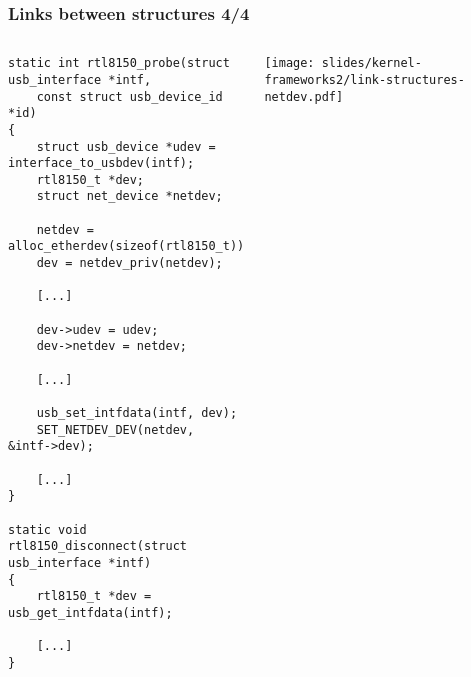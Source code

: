 \begin{frame}[fragile]
  \frametitle{Links between structures 4/4}
  \begin{columns}
    \begin{verbatim}
static int rtl8150_probe(struct usb_interface *intf,
    const struct usb_device_id *id)
{
    struct usb_device *udev = interface_to_usbdev(intf);
    rtl8150_t *dev;
    struct net_device *netdev;

    netdev = alloc_etherdev(sizeof(rtl8150_t));
    dev = netdev_priv(netdev);

    [...]

    dev->udev = udev;
    dev->netdev = netdev;

    [...]

    usb_set_intfdata(intf, dev);
    SET_NETDEV_DEV(netdev, &intf->dev);

    [...]
}

static void rtl8150_disconnect(struct usb_interface *intf)
{
    rtl8150_t *dev = usb_get_intfdata(intf);

    [...]
}
    \end{verbatim}
    \begin{center}
      \texttt{[image: slides/kernel-frameworks2/link-structures-netdev.pdf]}
    \end{center}
  \end{columns}
\end{frame}
